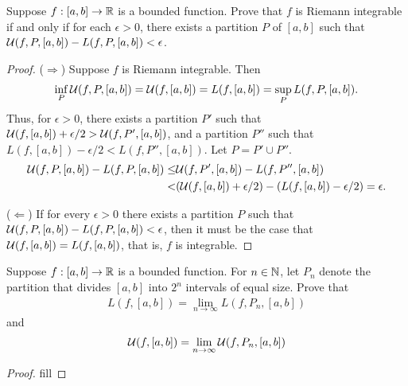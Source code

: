 \begin{exercise}{3}
Suppose $f:[a,b]\to\mathbb{R}$ is a bounded function. 
Prove that $f$ is Riemann integrable if and only if for each $\epsilon>0$, there exists a partition $P$ of $[a,b]$ such that $\mathcal{U}(f,P,[a,b]) - L(f,P,[a,b]) < \epsilon$.
\end{exercise}
\begin{proof}
($\Rightarrow$)
Suppose $f$ is Riemann integrable.
Then 
\begin{align*}
    \inf_P \mathcal{U}(f,P,[a,b]) = \mathcal{U}(f,[a,b]) = L(f,[a,b]) = \sup_P L(f,P,[a,b]).
\end{align*}
Thus, for $\epsilon>0$, there exists a partition $P'$ such that $\mathcal{U}(f,[a,b]) + \epsilon/2 > \mathcal{U}(f,P',[a,b])$, and a partition $P''$ such that $L(f,[a,b]) - \epsilon/2 < L(f,P'',[a,b])$.
Let $P = P' \cup P''$.
\begin{align*}
    \mathcal{U}(f,P,[a,b]) - L(f,P,[a,b]) 
    \leq& \mathcal{U}(f,P',[a,b]) - L(f,P'',[a,b])\\
    <& (\mathcal{U}(f,[a,b]) + \epsilon/2) 
    - (L(f,[a,b]) - \epsilon/2) = \epsilon.
\end{align*}

($\Leftarrow$)
If for every $\epsilon>0$ there exists a partition $P$ such that  $\mathcal{U}(f,P,[a,b]) - L(f,P,[a,b]) < \epsilon$, then it must be the case that $\mathcal{U}(f,[a,b]) = L(f,[a,b])$, that is, $f$ is integrable.
\end{proof} 

\begin{exercise}{7}
Suppose $f:[a,b]\to\mathbb{R}$ is a bounded function.
For $n\in\mathbb{N}$, let $P_n$ denote the partition that divides $[a,b]$ into $2^n$ intervals of equal size.
Prove that
\begin{align*}
    L(f,[a,b]) = \lim_{n\to\infty} L(f,P_n,[a,b])
\end{align*}
and
\begin{align*}
    \mathcal{U}(f,[a,b]) = \lim_{n\to\infty} \mathcal{U}(f,P_n,[a,b])
\end{align*}
\end{exercise}
\begin{proof}
fill
\end{proof} 

